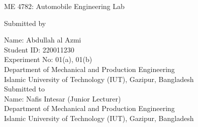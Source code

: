 \begin{titlepage}
	\begin{center}
		{\Huge{ME 4782: Automobile Engineering Lab}} \\
	\end{center}

	\vfill

	\begin{Large}

		Submitted by

		Name: Abdullah al Azmi \\
		Student ID: 220011230 \\
		Experiment No: 01(a), 01(b) \\
		Department of Mechanical and Production Engineering \\
		Islamic University of Technology (IUT), Gazipur, Bangladesh \\

		Submitted to \\

		Name: Nafis Intesar (Junior Lecturer) \\
		Department of Mechanical and Production Engineering \\
		Islamic University of Technology (IUT), Gazipur, Bangladesh

	\end{Large}

\end{titlepage}
